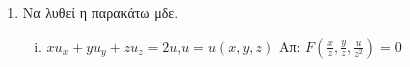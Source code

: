 \begin{enumerate}
  \item Να λυθεί η παρακάτω μδε.
    \begin{enumerate}[i)]
      \item $xu_{x}+yu_{y}+zu_{z}=2u$,\quad $u=u(x,y,z)$ \hfill Απ: $F(\frac{x}{z},\frac{y}{z},\frac{u}{z^{2}})=0$

    \end{enumerate}
\end{enumerate}


